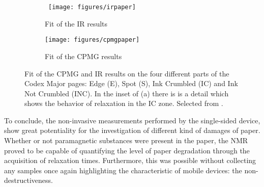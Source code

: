 \documentclass[a4paper,11pt]{report}
\begin{document}
\begin{figure}[h]
\centering
\begin{subfigure}{0.6\textwidth}
\
\texttt{[image: figures/irpaper]} 
\caption{Fit of the IR results}
\end{subfigure}
\begin{subfigure}{0.6\textwidth}
\texttt{[image: figures/cpmgpaper]}
\caption{Fit of the CPMG results}
\end{subfigure}
\caption{Fit of the CPMG and IR results on the four different parts of the Codex Major pages: Edge (E), Spot (S), Ink Crumbled (IC) and Ink Not Crumbled (INC). In the inset of (a) there is is a detail which shows the behavior of relaxation in the IC zone. Selected from \cite{duepaper}.}\label{paper2}
\end{figure}

To conclude, the non-invasive measurements performed by the single-sided device, show great potentiality for the investigation of different kind of damages of paper. Whether or not paramagnetic substances were present in the paper, the NMR proved to be capable of quantifying the level of paper degradation through the acquisition of relaxation times. Furthermore, this was possible without collecting any samples once again highlighting the characteristic of mobile devices: the non-destructiveness.
\clearpage
\end{document}
